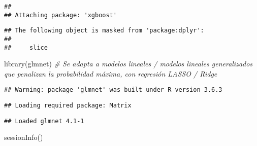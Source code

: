 \documentclass[]{article}
\newenvironment{Shaded}{\begin{snugshade}}{\end{snugshade}}
\newcommand{\CommentTok}[1]{\textcolor[rgb]{0.56,0.35,0.01}{\textit{#1}}}
\newcommand{\FunctionTok}[1]{\textcolor[rgb]{0.00,0.00,0.00}{#1}}
\newcommand{\NormalTok}[1]{#1}
\newcommand{\StringTok}[1]{\textcolor[rgb]{0.31,0.60,0.02}{#1}}
\begin{document}
\begin{verbatim}
## 
## Attaching package: 'xgboost'
\end{verbatim}

\begin{verbatim}
## The following object is masked from 'package:dplyr':
## 
##     slice
\end{verbatim}

\begin{Shaded}
\begin{Highlighting}[]
\FunctionTok{library}\NormalTok{(}\StringTok{\textquotesingle{}glmnet\textquotesingle{}}\NormalTok{) }\CommentTok{\# Se adapta a modelos lineales / modelos lineales generalizados que penalizan la probabilidad máxima, con regresión LASSO / Ridge}
\end{Highlighting}
\end{Shaded}

\begin{verbatim}
## Warning: package 'glmnet' was built under R version 3.6.3
\end{verbatim}

\begin{verbatim}
## Loading required package: Matrix
\end{verbatim}

\begin{verbatim}
## Loaded glmnet 4.1-1
\end{verbatim}

\begin{Shaded}
\begin{Highlighting}[]
\FunctionTok{sessionInfo}\NormalTok{()}
\end{Highlighting}
\end{Shaded}
\end{document}
